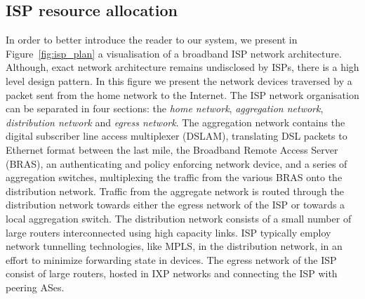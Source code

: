 \subsection{ISP resource allocation} \label{s:qos:motivation}


In order to better introduce the reader to our system, we present in
Figure~\ref{fig:isp_plan} a visualisation of a broadband ISP network
architecture.  Although, exact network architecture remains undisclosed by ISPs,
there is a high level design pattern. In this figure we present the network
devices traversed by a packet sent from the home network to the Internet.  
The ISP network organisation can be separated in four sections: the {\it home
  network}, {\it aggregation network}, {\it distribution network} and {\it
  egress network}. The aggregation network contains the digital subscriber line
access multiplexer (DSLAM), translating DSL packets to Ethernet format between
the last mile,  the Broadband Remote Access Server (BRAS), an authenticating and
policy enforcing network device, and a series of aggregation switches,
multiplexing the traffic from the various BRAS onto the distribution network.
Traffic from the aggregate network is routed through the distribution network
towards either the egress network of the ISP or towards a local aggregation
switch. The distribution network consists of a small number of large routers
interconnected using high capacity links.  ISP typically employ network
tunnelling technologies, like MPLS, in the distribution network, in an effort to
minimize forwarding state in devices.  The egress network of the ISP consist of
large routers, hosted in IXP networks and connecting the ISP with peering ASes.

